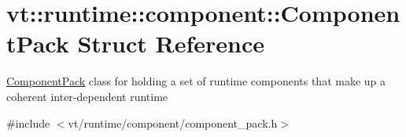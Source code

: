 \hypertarget{structvt_1_1runtime_1_1component_1_1_component_pack}{}\section{vt\+:\+:runtime\+:\+:component\+:\+:Component\+Pack Struct Reference}
\label{structvt_1_1runtime_1_1component_1_1_component_pack}


{\ttfamily \hyperlink{structvt_1_1runtime_1_1component_1_1_component_pack}{Component\+Pack}} class for holding a set of runtime components that make up a coherent inter-\/dependent runtime  




{\ttfamily \#include $<$vt/runtime/component/component\+\_\+pack.\+h$>$}

